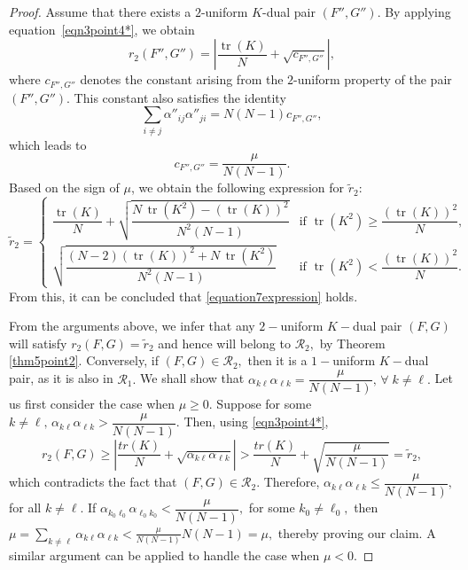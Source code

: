 \documentclass[10pt,a4paper]{amsart}
\begin{document}
\begin{proof}
		
		\par 	Assume that there exists a $2$-uniform $K$-dual pair $(F'', G'')$. By applying equation~\eqref{eqn3point4*}, we obtain
\[
r_2(F'', G'') = \left| \dfrac{\operatorname{tr}(K)}{N} + \sqrt{c_{F'', G''}} \right|,
\]
where \( c_{F'', G''} \) denotes the constant arising from the $2$-uniform property of the pair \( (F'', G'') \). This constant also satisfies the identity
\[
\sum_{i \neq j} \alpha''_{ij} \alpha''_{ji} = N(N-1) c_{F'', G''},
\]
which leads to
\[
c_{F'', G''} = \dfrac{\mu}{N(N-1)}.
\]
Based on the sign of \( \mu \), we obtain the following expression for \( \tilde{r}_2 \):
\[
\tilde{r}_2 =
\begin{cases}
\dfrac{\operatorname{tr}(K)}{N} + \sqrt{\dfrac{N\,\operatorname{tr}(K^2) - (\operatorname{tr}(K))^2}{N^2(N-1)}} & \text{if } \operatorname{tr}(K^2) \geq \dfrac{(\operatorname{tr}(K))^2}{N}, \\[2em]
\sqrt{\dfrac{(N-2)(\operatorname{tr}(K))^2 + N\,\operatorname{tr}(K^2)}{N^2(N-1)}} & \text{if } \operatorname{tr}(K^2) < \dfrac{(\operatorname{tr}(K))^2}{N}.
\end{cases}
\]
From this, it can be concluded that \eqref{equation7expression} holds.
\par From the arguments above, we infer that any  $2-$uniform $K-$dual pair $(F,G)$ will satisfy ${r}_{2} (F,G) = \tilde{r}_{2}$ and hence will belong to $\mathcal{R}_{2},$ by Theorem \ref{thm5point2}.	 Conversely, if $(F,G) \in \mathcal{R}_{2},$ then it is a $1-$uniform $K-$dual pair, as it is also in $\mathcal{R}_{1}.$ We shall show that $\alpha_{k\ell}\alpha_{\ell k} = \dfrac{\mu}{N(N-1)},\,\forall\;k \neq \ell.$ Let us first consider the case when  $\mu \geq 0.$ Suppose for some $k \neq \ell,\, \alpha_{k\ell}\alpha_{\ell k} >  \dfrac{\mu}{N(N-1)}.$ Then, using \eqref{eqn3point4*},
		$${r}_{2} (F,G) \geq  \left| \dfrac{tr(K)}{N}+ \sqrt{ \alpha_{k\ell}\alpha_{\ell k}}   \right| > \dfrac{tr(K)}{N} + \sqrt{ \frac{\mu}{N(N-1)}} = \tilde{r}_{2},$$
		which contradicts the fact that $(F,G) \in \mathcal{R}_{2}.$ Therefore, $ \alpha_{k\ell}\alpha_{\ell k} \leq \dfrac{\mu}{N(N-1)},$	for all $k \neq \ell. $ If $\alpha_{k_0 \ell_0}\alpha_{\ell_0 k_0} < \dfrac{\mu}{N(N-1)},$ for some $k_0 \neq \ell_0,$ then $\mu =\displaystyle{\sum_{k \neq \ell}\alpha_{k \ell}\alpha_{\ell k} < \frac{\mu}{N(N-1)} N(N-1)} = \mu,$ thereby proving our claim. A similar argument can be applied to handle the case when \( \mu < 0 \).
	\end{proof}
\end{document}
